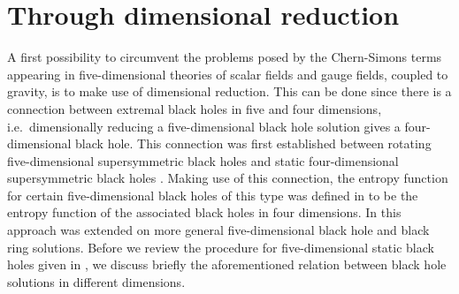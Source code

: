 \documentclass[12pt,twoside]{book}
\begin{document}
\section{Through dimensional reduction}\label{EF-CS-dimRed}

A first possibility to circumvent the problems posed by the Chern-Simons terms appearing in five-dimensional theories of scalar fields and gauge fields, coupled to gravity, is to make use of dimensional reduction. This can be done since there is a connection between extremal black holes in five and four dimensions, i.e.\ dimensionally reducing a five-dimensional black hole solution gives a four-dimensional black hole. This connection was first established between rotating five-dimensional supersymmetric black holes and static four-dimensional supersymmetric black holes \cite{Gaiotto:2006fk}. Making use of this connection, the entropy function for certain five-dimensional black holes of this type was defined in \cite{Cardoso:2007vn} to be the entropy function of the associated black holes in four dimensions. In \cite{Goldstein:2007kx} this approach was extended on more general five-dimensional black hole and black ring solutions. Before we review the procedure for five-dimensional static black holes given in \cite{Goldstein:2007kx}, we discuss briefly the aforementioned relation between black hole solutions in different dimensions.
\end{document}
